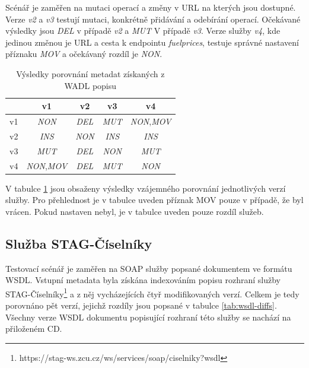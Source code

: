\documentclass[czech,DP]{thesiskiv}
\begin{document}
Scénář je zaměřen na mutaci operací a změny v URL na kterých jsou dostupné. Verze \textit{v2} a \textit{v3} testují mutaci, konkrétně přidávání a odebírání operací. Očekávané výsledky jsou \textit{DEL} v případě \textit{v2} a \textit{MUT} V případě \textit{v3}. Verze služby \textit{v4}, kde jedinou změnou je URL a cesta k endpointu \textit{fuelprices}, testuje správné nastavení příznaku \textit{MOV} a očekávaný rozdíl je \textit{NON}.

\begin{table}[h]
	\centering
	\begin{tabular}{|l||c|c|c|c|}
		\hline
		& v1 & v2 & v3 & v4 \\
		\hline
		\hline
		v1 & \textit{NON} & \textit{DEL} & \textit{MUT} & \textit{NON},\textit{MOV} \\
		\hline
		v2 & \textit{INS} & \textit{NON} & \textit{INS} & \textit{INS} \\
		\hline
		v3 & \textit{MUT} & \textit{DEL} & \textit{NON} & \textit{MUT} \\
		\hline
		v4 & \textit{NON},\textit{MOV} & \textit{DEL} & \textit{MUT} & \textit{NON} \\
		\hline
	\end{tabular}
	\caption{Výsledky porovnání metadat získaných z WADL popisu}
	\label{tab:wadl-cmp-res}
\end{table} 

V tabulce \ref{tab:wadl-cmp-res} jsou obsaženy výsledky vzájemného porovnání jednotlivých verzí služby. Pro přehlednost je v tabulce uveden příznak MOV pouze v případě, že byl vrácen. Pokud nastaven nebyl, je v tabulce uveden pouze rozdíl služeb. 

\subsection{Služba STAG-Číselníky}

Testovací scénář je zaměřen na SOAP služby popsané dokumentem ve formátu WSDL. Vstupní metadata byla získána indexováním popisu rozhraní služby STAG-Číselníky\footnote{https://stag-ws.zcu.cz/ws/services/soap/ciselniky?wsdl} a z něj vycházejících čtyř modifikovaných verzí. Celkem je tedy porovnáno pět verzí, jejichž rozdíly jsou popsané v tabulce \ref{tab:wsdl-diffs}. Všechny verze WSDL dokumentu popisující rozhraní této služby se nachází na přiloženém CD.
\end{document}

